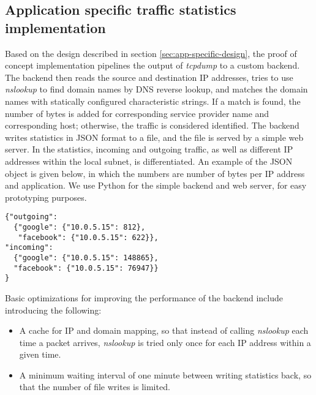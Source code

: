 \subsection{Application specific traffic statistics implementation}

Based on the design described in section \ref{sec:app-specific-design}, the proof of concept implementation pipelines the output of \textit{tcpdump} to a custom backend. The backend then reads the source and destination IP addresses, tries to use \textit{nslookup} to find domain names by DNS reverse lookup, and matches the domain names with statically configured characteristic strings. If a match is found, the number of bytes is added for corresponding service provider name and corresponding host; otherwise, the traffic is considered identified. The backend writes statistics in JSON format to a file, and the file is served by a simple web server. In the statistics, incoming and outgoing traffic, as well as different IP addresses within the local subnet, is differentiated. An example of the JSON object is given below, in which the numbers are number of bytes per IP address and application. We use Python for the simple backend and web server, for easy prototyping purposes.

\begin{listing}
\begin{verbatim}
{"outgoing": 
  {"google": {"10.0.5.15": 812}, 
   "facebook": {"10.0.5.15": 622}}, 
"incoming": 
  {"google": {"10.0.5.15": 148865}, 
  "facebook": {"10.0.5.15": 76947}}
}
\end{verbatim}
\end{listing}

Basic optimizations for improving the performance of the backend include introducing the following:
\begin{itemize}

\item A cache for IP and domain mapping, so that instead of calling \textit{nslookup} each time a packet arrives, \textit{nslookup} is tried only once for each IP address within a given time.

\item A minimum waiting interval of one minute between writing statistics back, so that the number of file writes is limited.

\end{itemize}
